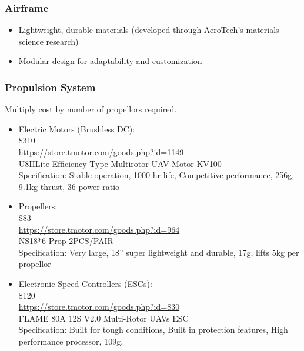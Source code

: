 \subsubsection{Airframe}
\begin{itemize}
    \item Lightweight, durable materials (developed through AeroTech's materials science research)
    \item Modular design for adaptability and customization
\end{itemize}

\subsubsection{Propulsion System}
Multiply cost by number of propellors required.
\begin{itemize}
    \item Electric Motors (Brushless DC): \\ \$310 \\
    \href{https://store.tmotor.com/goods.php?id=1149}{https://store.tmotor.com/goods.php?id=1149} \\
    U8IILite Efficiency Type Multirotor UAV Motor KV100 \\
    Specification: Stable operation, 1000 hr life, Competitive performance, 256g, 9.1kg thrust, 36 power ratio

    \item Propellers: \\ \$83
\\ \href{https://store.tmotor.com/goods.php?id=964}{https://store.tmotor.com/goods.php?id=964} \\
NS18*6 Prop-2PCS/PAIR
\\ Specification: Very large, 18” super lightweight and durable, 17g, lifts 5kg per propellor

    \item Electronic Speed Controllers (ESCs):\\ \$120 \\
\href{https://store.tmotor.com/goods.php?id=830}{https://store.tmotor.com/goods.php?id=830} \\
	FLAME 80A 12S V2.0 Multi-Rotor UAVs ESC \\
Specification: Built for tough conditions, Built in protection features, High performance processor, 109g, 

\end{itemize}

